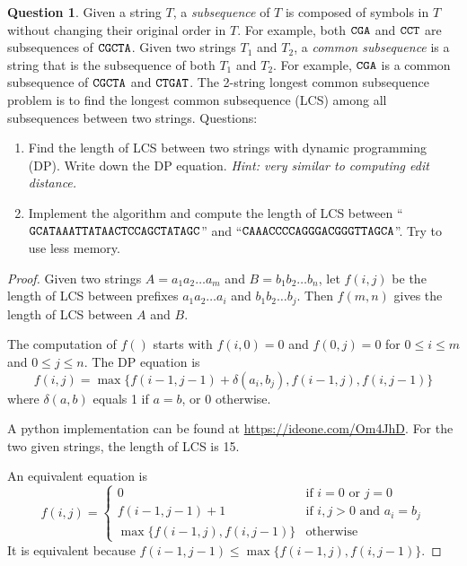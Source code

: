 \documentclass{article}[10pt]
\theoremstyle{definition}\newtheorem{question}{Question}
\begin{document}
\begin{question}
Given a string $T$, a \emph{subsequence} of $T$ is composed of symbols in $T$
without changing their original order in $T$. For example, both ${\tt CGA}$ and
${\tt CCT}$ are subsequences of ${\tt CGCTA}$. Given two strings $T_1$ and
$T_2$, a \emph{common subsequence} is a string that is the subsequence of both
$T_1$ and $T_2$. For example, ${\tt CGA}$ is a common subsequence of ${\tt
CGCTA}$ and ${\tt CTGAT}$. The 2-string longest common subsequence problem
is to find the longest common subsequence (LCS) among all subsequences between
two strings. Questions:
\begin{enumerate}
\item Find the length of LCS between two strings with dynamic programming (DP).
Write down the DP equation. \emph{Hint: very similar to computing edit distance.}
\item Implement the algorithm and compute the length of LCS between 
``${\tt GCATAAATTATAACTCCAGCTATAGC}$'' and ``${\tt CAAACCCCAGGGACGGGTTAGCA}$''.
Try to use less memory.
\end{enumerate}
\end{question}

\begin{proof}
Given two strings $A=a_1a_2\ldots a_m$ and $B=b_1b_2\ldots b_n$, let $f(i,j)$
be the length of LCS between prefixes $a_1a_2\ldots a_i$ and $b_1b_2\ldots
b_j$. Then $f(m,n)$ gives the length of LCS between $A$ and $B$.

The computation of $f()$ starts with $f(i,0)=0$ and $f(0,j)=0$ for $0\le i\le m$
and $0\le j\le n$. The DP equation is
$$
f(i,j)=\max\{f(i-1,j-1)+\delta(a_i,b_j),f(i-1,j),f(i,j-1)\}
$$
where $\delta(a,b)$ equals 1 if $a=b$, or 0 otherwise.

A python implementation can be found at
\href{https://ideone.com/Om4JhD}{https://ideone.com/Om4JhD}. For the two given
strings, the length of LCS is 15.

An equivalent equation is
$$
f(i,j)=\left\{\begin{array}{ll}
0            & \mbox{if $i=0$ or $j=0$}\\
f(i-1,j-1)+1 & \mbox{if $i,j>0$ and $a_i=b_j$}\\ 
\max\{f(i-1,j),f(i,j-1)\} & \mbox{otherwise}
\end{array}\right.
$$
It is equivalent because $f(i-1,j-1)\le\max\{f(i-1,j),f(i,j-1)\}$.
\end{proof}
\end{document}

